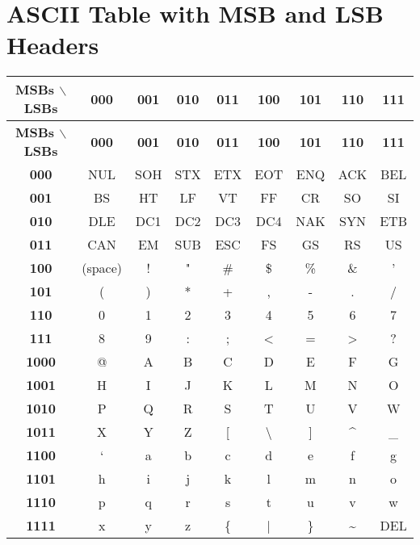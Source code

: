 \documentclass[12pt]{article} %
\begin{document}
\newpage
    \section*{ASCII Table with MSB and LSB Headers}
    \begin{longtable}{|c|c|c|c|c|c|c|c|c|} 
        \hline
        \textbf{MSBs $\backslash$ LSBs} & \textbf{000} & \textbf{001} & \textbf{010} & \textbf{011} & \textbf{100} & \textbf{101} & \textbf{110} & \textbf{111} \\
        \hline
        \endfirsthead
        \hline
        \textbf{MSBs $\backslash$ LSBs} & \textbf{000} & \textbf{001} & \textbf{010} & \textbf{011} & \textbf{100} & \textbf{101} & \textbf{110} & \textbf{111} \\
        \hline
        \endhead
        \hline
        \endfoot
        \textbf{000} & NUL & SOH & STX & ETX & EOT & ENQ & ACK & BEL \\
        \hline
        \textbf{001} & BS  & HT  & LF  & VT  & FF  & CR  & SO  & SI  \\
        \hline
        \textbf{010} & DLE & DC1 & DC2 & DC3 & DC4 & NAK & SYN & ETB \\
        \hline
        \textbf{011} & CAN & EM  & SUB & ESC & FS  & GS  & RS  & US  \\
        \hline
        \textbf{100} & (space) & ! & " & \# & \$ & \% & \& & ' \\
        \hline
        \textbf{101} & ( & ) & * & + & , & - & . & / \\
        \hline
        \textbf{110} & 0 & 1 & 2 & 3 & 4 & 5 & 6 & 7 \\
        \hline
        \textbf{111} & 8 & 9 & : & ; & < & = & > & ? \\
        \hline
        \textbf{1000} & @ & A & B & C & D & E & F & G \\
        \hline
        \textbf{1001} & H & I & J & K & L & M & N & O \\
        \hline
        \textbf{1010} & P & Q & R & S & T & U & V & W \\
        \hline
        \textbf{1011} & X & Y & Z & [ & \textbackslash{} & ] & \^{} & \_ \\
        \hline
        \textbf{1100} & ` & a & b & c & d & e & f & g \\
        \hline
        \textbf{1101} & h & i & j & k & l & m & n & o \\
        \hline
        \textbf{1110} & p & q & r & s & t & u & v & w \\
        \hline
        \textbf{1111} & x & y & z & \{ & | & \} & \textasciitilde & DEL \\
        \hline
        \end{longtable}
\end{document}
